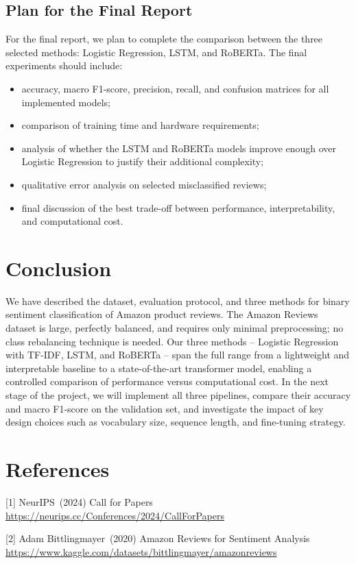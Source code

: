 \documentclass{article}
\begin{document}
\subsection{Plan for the Final Report}
For the final report, we plan to complete the comparison between the three
selected methods: Logistic Regression, LSTM, and RoBERTa. The final experiments
should include:
\begin{itemize}
  \item accuracy, macro F1-score, precision, recall, and confusion matrices for
  all implemented models;
  \item comparison of training time and hardware requirements;
  \item analysis of whether the LSTM and RoBERTa models improve enough over
  Logistic Regression to justify their additional complexity;
  \item qualitative error analysis on selected misclassified reviews;
  \item final discussion of the best trade-off between performance,
  interpretability, and computational cost.
\end{itemize}


\section{Conclusion}
We have described the dataset, evaluation protocol, and three methods for
binary sentiment classification of Amazon product reviews.
The Amazon Reviews dataset is large, perfectly balanced, and requires only
minimal preprocessing; no class rebalancing technique is needed.
Our three methods – Logistic Regression with TF-IDF, LSTM, and RoBERTa – 
span the full range from a lightweight and interpretable baseline to a
state-of-the-art transformer model, enabling a controlled comparison of
performance versus computational cost.
In the next stage of the project, we will implement all three pipelines,
compare their accuracy and macro F1-score on the validation set, and
investigate the impact of key design choices such as vocabulary size,
sequence length, and fine-tuning strategy.

\section*{References}

{\small
[1] NeurIPS\ (2024) Call for Papers\\ \url{https://neurips.cc/Conferences/2024/CallForPapers}

[2] Adam Bittlingmayer\ (2020) Amazon Reviews for Sentiment Analysis\\ \url{https://www.kaggle.com/datasets/bittlingmayer/amazonreviews}
}
\end{document}
